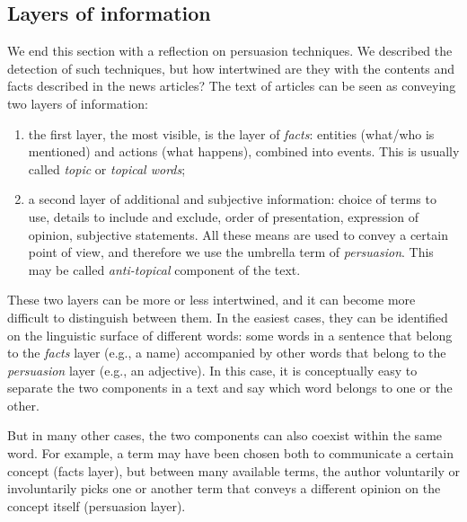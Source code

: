 \subsection{\statusgreen Layers of information}
\label{ssec:lit_layers_of_info}
We end this section with a reflection on persuasion techniques.
We described the detection of such techniques, but how intertwined are they with the contents and facts described in the news articles?
The text of articles can be seen as conveying two layers of information:
\begin{enumerate}
    \item the first layer, the most visible, is the layer of \emph{facts}: entities (what/who is mentioned) and actions (what happens), combined into events. This is usually called \emph{topic} or \emph{topical words};
    \item a second layer of additional and subjective information: choice of terms to use, details to include and exclude, order of presentation, expression of opinion, subjective statements. All these means are used to convey a certain point of view, and therefore we use the umbrella term of \emph{persuasion}. This may be called \emph{anti-topical} component of the text.
\end{enumerate}



These two layers can be more or less intertwined, and it can become more difficult to distinguish between them.
In the easiest cases, they can be identified on the linguistic surface of different words: some words in a sentence that belong to the \emph{facts} layer (e.g., a name) accompanied by other words that belong to the \emph{persuasion} layer (e.g., an adjective).
In this case, it is conceptually easy to separate the two components in a text and say which word belongs to one or the other.

But in many other cases, the two components can also coexist within the same word. For example, a term may have been chosen both to communicate a certain concept (facts layer), but between many available terms, the author voluntarily or involuntarily picks one or another term that conveys a different opinion on the concept itself (persuasion layer).


